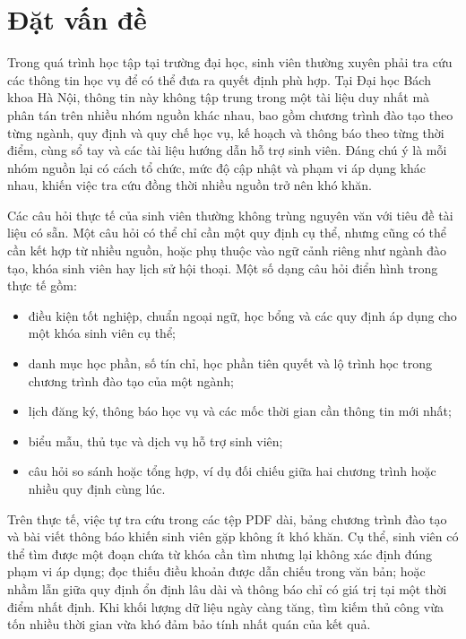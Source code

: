 \documentclass[../DoAn.tex]{subfiles}
\begin{document}
\section{Đặt vấn đề}
\label{sec:dvd}

Trong quá trình học tập tại trường đại học, sinh viên thường xuyên phải tra cứu
các thông tin học vụ để có thể đưa ra quyết định phù hợp. Tại Đại học Bách khoa
Hà Nội, thông tin này không tập trung trong một tài liệu duy nhất mà phân tán
trên nhiều nhóm nguồn khác nhau, bao gồm chương trình đào tạo theo từng ngành,
quy định và quy chế học vụ, kế hoạch và thông báo theo từng thời điểm, cùng sổ
tay và các tài liệu hướng dẫn hỗ trợ sinh viên. Đáng chú ý là mỗi nhóm nguồn
lại có cách tổ chức, mức độ cập nhật và phạm vi áp dụng khác nhau, khiến việc
tra cứu đồng thời nhiều nguồn trở nên khó khăn.

Các câu hỏi thực tế của sinh viên thường không trùng nguyên văn với tiêu đề
tài liệu có sẵn. Một câu hỏi có thể chỉ cần một quy định cụ thể, nhưng cũng
có thể cần kết hợp từ nhiều nguồn, hoặc phụ thuộc vào ngữ cảnh riêng như ngành
đào tạo, khóa sinh viên hay lịch sử hội thoại. Một số dạng câu hỏi điển hình
trong thực tế gồm:

\begin{itemize}
    \item điều kiện tốt nghiệp, chuẩn ngoại ngữ, học bổng và các quy định áp
    dụng cho một khóa sinh viên cụ thể;
    \item danh mục học phần, số tín chỉ, học phần tiên quyết và lộ trình học
    trong chương trình đào tạo của một ngành;
    \item lịch đăng ký, thông báo học vụ và các mốc thời gian cần thông tin mới
    nhất;
    \item biểu mẫu, thủ tục và dịch vụ hỗ trợ sinh viên;
    \item câu hỏi so sánh hoặc tổng hợp, ví dụ đối chiếu giữa hai chương trình
    hoặc nhiều quy định cùng lúc.
\end{itemize}

Trên thực tế, việc tự tra cứu trong các tệp PDF dài, bảng chương trình đào tạo
và bài viết thông báo khiến sinh viên gặp không ít khó khăn. Cụ thể, sinh viên
có thể tìm được một đoạn chứa từ khóa cần tìm nhưng lại không xác định đúng
phạm vi áp dụng; đọc thiếu điều khoản được dẫn chiếu trong văn bản; hoặc nhầm
lẫn giữa quy định ổn định lâu dài và thông báo chỉ có giá trị tại một thời điểm
nhất định. Khi khối lượng dữ liệu ngày càng tăng, tìm kiếm thủ công vừa tốn
nhiều thời gian vừa khó đảm bảo tính nhất quán của kết quả.
\end{document}
